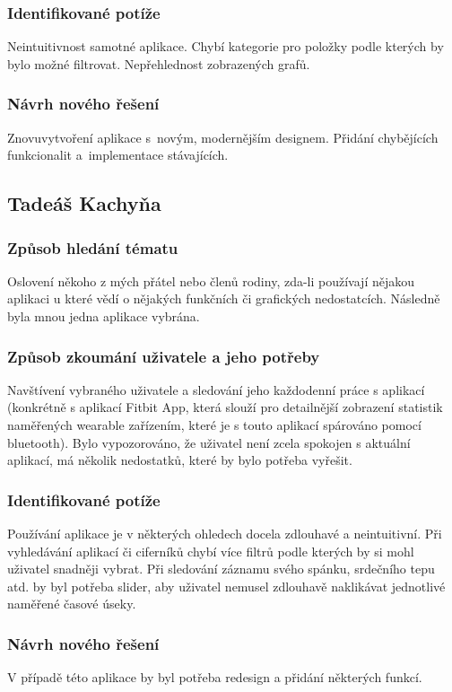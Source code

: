 \documentclass[12pt, titlepage]{article}
\begin{document}
\subsubsection{Identifikované potíže}
Neintuitivnost samotné aplikace. Chybí kategorie pro položky podle kterých by bylo možné filtrovat. Nepřehlednost zobrazených grafů.
\subsubsection{Návrh nového řešení}
Znovuvytvoření aplikace s~novým, modernějším designem. Přidání chybějících funkcionalit a~implementace stávajících.

\subsection{Tadeáš Kachyňa}
\subsubsection{Způsob hledání tématu}
Oslovení někoho z mých přátel nebo členů rodiny, zda-li používají nějakou aplikaci u které vědí o nějakých funkčních či grafických nedostatcích. Následně byla mnou jedna aplikace vybrána. 
\subsubsection{Způsob zkoumání uživatele a jeho potřeby}
Navštívení vybraného uživatele a sledování jeho každodenní práce s aplikací (konkrétně s aplikací Fitbit App, která slouží pro detailnější zobrazení statistik naměřených wearable zařízením, které je s touto aplikací spárováno pomocí bluetooth). Bylo vypozorováno, že uživatel není zcela spokojen s aktuální aplikací, má několik nedostatků, které by bylo potřeba vyřešit.
\subsubsection{Identifikované potíže}
Používání aplikace je v některých ohledech docela zdlouhavé a neintuitivní. Při vyhledávání aplikací či ciferníků chybí více filtrů podle kterých by si mohl uživatel snadněji vybrat. Při sledování záznamu svého spánku, srdečního tepu atd. by byl potřeba slider, aby uživatel nemusel zdlouhavě naklikávat jednotlivé naměřené časové úseky.  
\subsubsection{Návrh nového řešení}
V případě této aplikace by byl potřeba redesign a přidání některých funkcí. 
\end{document}
